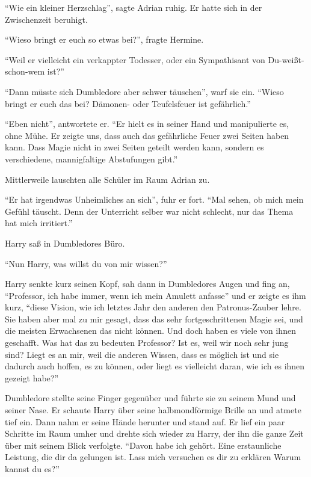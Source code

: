 \enquote{Wie ein kleiner Herzschlag}, sagte Adrian ruhig. Er hatte sich in der Zwischenzeit beruhigt.

\enquote{Wieso bringt er euch so etwas bei?}, fragte Hermine.

\enquote{Weil er vielleicht ein verkappter Todesser, oder ein Sympathisant von Du-weißt-schon-wem ist?}

\enquote{Dann müsste sich Dumbledore aber schwer täuschen}, warf sie ein. \enquote{Wieso bringt er euch das bei? Dämonen- oder Teufelsfeuer ist gefährlich.}

\enquote{Eben nicht}, antwortete er. \enquote{Er hielt es in seiner Hand und manipulierte es, ohne Mühe. Er zeigte uns, dass auch das gefährliche Feuer zwei Seiten haben kann. Dass Magie nicht in zwei Seiten geteilt werden kann, sondern es verschiedene, mannigfaltige Abstufungen gibt.}

Mittlerweile lauschten alle Schüler im Raum Adrian zu.

\enquote{Er hat irgendwas Unheimliches an sich}, fuhr er fort. \enquote{Mal sehen, ob mich mein Gefühl täuscht. Denn der Unterricht selber war nicht schlecht, nur das Thema hat mich irritiert.}

\trenn

Harry saß in Dumbledores Büro.

\enquote{Nun Harry, was willst du von mir wissen?}

Harry senkte kurz seinen Kopf, sah dann in Dumbledores Augen und fing an, \enquote{Professor, \gst ich habe immer, wenn ich mein Amulett anfasse} und er zeigte es ihm kurz, \enquote{diese Vision, wie ich letztes Jahr den anderen den Patronus-Zauber lehre. Sie haben aber mal zu mir gesagt, dass das sehr fortgeschrittenen Magie sei, und die meisten Erwachsenen das nicht können. Und doch haben es viele von ihnen geschafft. Was hat das zu bedeuten Professor? Ist es, weil wir noch sehr jung sind? Liegt es an mir, weil die anderen Wissen, dass es möglich ist und sie dadurch auch hoffen, es zu können, oder liegt es vielleicht daran, wie ich es ihnen gezeigt habe?}

Dumbledore stellte seine Finger gegenüber und führte sie zu seinem Mund und seiner Nase. Er schaute Harry über seine halbmondförmige Brille an und atmete tief ein. Dann nahm er seine Hände herunter und stand auf. Er lief ein paar Schritte im Raum umher und drehte sich wieder zu Harry, der ihn die ganze Zeit über mit seinem Blick verfolgte. \enquote{Davon habe ich gehört. Eine erstaunliche Leistung, die dir da gelungen ist. Lass mich versuchen es dir zu erklären \gst Warum kannst du es?}

